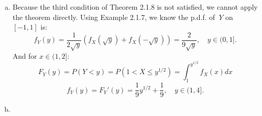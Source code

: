 \documentclass[14pt]{elegantbook}
\begin{document}
    \begin{solution}
        \begin{enumerate}[(a)]
            \item Because the third condition of Theorem 2.1.8 is not satisfied, we cannot apply the theorem directly. 
            Using Example 2.1.7, we know the p.d.f. of $\ Y$ on $[-1,1]$ is: 
            \[f_Y(y)=\frac{1}{2\sqrt{y}}(f_X(\sqrt{y})+f_X(-\sqrt{y}))=\frac{2}{9\sqrt{y}},\quad y\in (0, 1]. \]
            And for $x\in (1,2]$: 
            \[F_Y(y)=P(Y<y)=P(1<X\leq y^{1/2})=\int_{1}^{y^{1/2}}f_X(x)dx\]
            \[f_Y(y)=F_Y'(y)=\frac{1}{9}y^{1/2}+\frac{1}{9}, \quad y\in(1,4]. \]
            \item 
        \end{enumerate}
    \end{solution}

    \begin{exercise}
        
    \end{exercise}

    \begin{solution}
        
    \end{solution}

    \setcounter{exer}{10}
    \begin{exercise}
        
    \end{exercise}

    \begin{solution}
        
    \end{solution}

    \setcounter{exer}{22}
    \begin{exercise}
        
    \end{exercise}

    \begin{solution}
        
    \end{solution}

    \setcounter{exer}{24}
    \begin{exercise}
        
    \end{exercise}

    \begin{solution}
        
    \end{solution}

    \setcounter{exer}{31}
    \begin{exercise}
        
    \end{exercise}

    \begin{solution}
        
    \end{solution}

    \begin{exercise}
        
    \end{exercise}

    \begin{solution}
        
    \end{solution}
\end{document}
